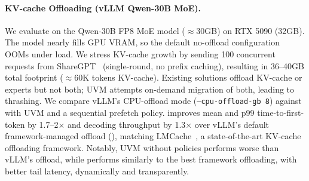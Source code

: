 \paragraph{KV-cache Offloading (vLLM Qwen-30B MoE).}
We evaluate \sys on the Qwen-30B FP8 MoE model ($\approx$30GB) on RTX 5090 (32GB).
The model nearly fills GPU VRAM, so the default no-offload configuration OOMs under load.
We stress KV-cache growth by sending 100 concurrent requests from ShareGPT~\cite{sharegpt} (single-round, no prefix caching), resulting in 36--40GB total footprint ($\approx$60K tokens KV-cache).
Existing solutions offload KV-cache or experts but not both; UVM attempts on-demand migration of both, leading to thrashing.
We compare vLLM's CPU-offload mode (\texttt{--cpu-offload-gb 8}) against \sys with UVM and a sequential prefetch policy.
\sys improves mean and p99 time-to-first-token by 1.7--2$\times$ and decoding throughput by 1.3$\times$ over vLLM's default framework-managed offload (), matching LMCache~\cite{lmcache}, a state-of-the-art KV-cache offloading framework.
Notably, UVM without \sys policies performs worse than vLLM's offload, while \sys performs similarly to the best framework offloading, with better tail latency, dynamically and transparently.


